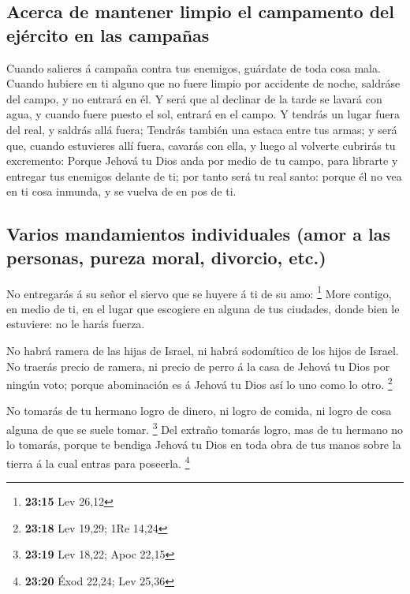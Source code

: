 \hypertarget{acerca-de-mantener-limpio-el-campamento-del-ejuxe9rcito-en-las-campauxf1as}{%
\subsection{Acerca de mantener limpio el campamento del ejército en las
campañas}\label{acerca-de-mantener-limpio-el-campamento-del-ejuxe9rcito-en-las-campauxf1as}}

 Cuando salieres á campaña contra tus enemigos, guárdate de
toda cosa mala.  Cuando hubiere en ti alguno que no fuere
limpio por accidente de noche, saldráse del campo, y no entrará en él.
 Y será que al declinar de la tarde se lavará con agua, y
cuando fuere puesto el sol, entrará en el campo.  Y tendrás
un lugar fuera del real, y saldrás allá fuera;  Tendrás
también una estaca entre tus armas; y será que, cuando estuvieres allí
fuera, cavarás con ella, y luego al volverte cubrirás tu excremento:
 Porque Jehová tu Dios anda por medio de tu campo, para
librarte y entregar tus enemigos delante de ti; por tanto será tu real
santo: porque él no vea en ti cosa inmunda, y se vuelva de en pos de ti.

\hypertarget{varios-mandamientos-individuales-amor-a-las-personas-pureza-moral-divorcio-etc.}{%
\subsection{Varios mandamientos individuales (amor a las personas,
pureza moral, divorcio,
etc.)}\label{varios-mandamientos-individuales-amor-a-las-personas-pureza-moral-divorcio-etc.}}

 No entregarás á su señor el siervo que se huyere á ti de
su amo: \footnote{\textbf{23:15} Lev 26,12}  More contigo,
en medio de ti, en el lugar que escogiere en alguna de tus ciudades,
donde bien le estuviere: no le harás fuerza.

 No habrá ramera de las hijas de Israel, ni habrá
sodomítico de los hijos de Israel.  No traerás precio de
ramera, ni precio de perro á la casa de Jehová tu Dios por ningún voto;
porque abominación es á Jehová tu Dios así lo uno como lo otro.
\footnote{\textbf{23:18} Lev 19,29; 1Re 14,24}

 No tomarás de tu hermano logro de dinero, ni logro de
comida, ni logro de cosa alguna de que se suele tomar. \footnote{\textbf{23:19}
  Lev 18,22; Apoc 22,15}  Del extraño tomarás logro, mas de
tu hermano no lo tomarás, porque te bendiga Jehová tu Dios en toda obra
de tus manos sobre la tierra á la cual entras para poseerla. \footnote{\textbf{23:20}
  Éxod 22,24; Lev 25,36}

